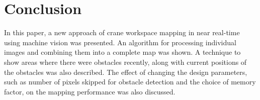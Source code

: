 \documentclass[twocolumn,10pt]{asme2e}
\begin{document}

\section*{Conclusion}
In this paper, a new approach of crane workspace mapping in near real-time using machine vision was presented. An algorithm for processing individual images and combining them into a complete map was shown. A technique to show areas where there were obstacles recently, along with current positions of the obstacles was also described. The effect of changing the design parameters, such as number of pixels skipped for obstacle detection and the choice of memory factor, on the mapping performance was also discussed. 
%
%
%
%
%
\end{document}
